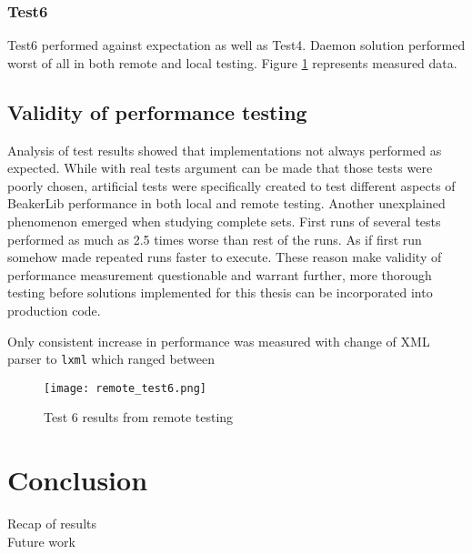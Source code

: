 \subsection{Test6}
Test6 performed against expectation as well as Test4. Daemon solution performed worst of all in both remote and local testing. Figure \ref{fig:remote_test6} represents measured data.

\section{Validity of performance testing}
Analysis of test results showed that implementations not always performed as expected. While with real tests argument can be made that those tests were poorly chosen, artificial tests were specifically created to test different aspects of BeakerLib performance in both local and remote testing. Another unexplained phenomenon emerged when studying complete sets. First runs of several tests performed as much as 2.5 times worse than rest of the runs. As if first run somehow made repeated runs faster to execute.
These reason make validity of performance measurement questionable and warrant further, more thorough testing before solutions implemented for this thesis can be  incorporated into production code.

Only consistent increase in performance was measured with change of XML parser to \texttt{lxml} which ranged between 

\begin{figure}
  \texttt{[image: remote\_test6.png]}
  \caption{Test 6 results from remote testing}
  \label{fig:remote_test6}
\end{figure}

\chapter{Conclusion}
\label{conclusion}
Recap of results
\\
Future work


